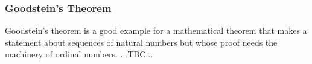 \subsubsection{Goodstein's Theorem}
Goodstein's theorem is a good example for a mathematical theorem that makes a statement about sequences of natural numbers but whose proof needs the machinery of ordinal numbers. ...TBC...


\begin{comment}

ToDo:

-Re-organize the matrial about transfinite numbers
 -Pull the order theory and transfinite recursion stuff out of the ordinal numbers section
  and put it before the "Numbers as Sets" section
 -start with Beth numbers (they are the easiest to understand)
 -then introduce cardinal numbers in a perliminary/informal way, i.e. without introducing 
  them as special ordinal numbers
 -then intrpduce ordinal numbers
 -then revisit cardinal numbers and define them properly as special ordinal numbers
 -the rationale in splitting the material about cardinals into two parts is that they are
  easier to understand

-cardinality = size type, "ordinality" = order type (not an official term, I think)

\section{Naive and Axiomatic Set Theory}

\section{Order Theory}
...
\subsection{Transfinite Processes}

\section{Numbers as Sets}
...
\subsection{Transfinite Numbers}

\subsubsection{Beth Numbers}

\end{comment}
